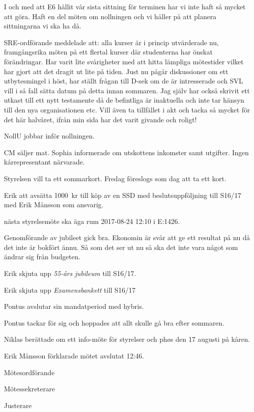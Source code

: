 \documentclass[10pt]{article}
\def\mo{Erik Månsson}
\def\ms{Johan Karlberg}
\def\ji{Linnea Sjödahl}
\begin{document}
\begin{paragrafer}
\begin{paragrafer}
I och med att E6 hållit vår sista sittning för terminen har vi inte haft så mycket att göra. Haft en del möten om nollningen och vi håller på att planera sittningarna vi ska ha då.

SRE-ordförande meddelade att: alla kurser är i princip utvärderade nu, framgångsrika möten på ett flertal kurser där studenterna har önskat förändringar. Har varit lite svårigheter med att hitta lämpliga mötestider vilket har gjort att det dragit ut lite på tiden. Just nu pågår diskussioner om ett utbytesmingel i höst, har ställt frågan till D-sek om de är intresserade och SVL vill i så fall sätta datum på detta innan sommaren. Jag själv har också skrivit ett utkast till ett nytt testamente då de befintliga är inaktuella och inte tar hänsyn till den nya organisationen etc. Vill även ta tillfället i akt och tacka så mycket för det här halvåret, ifrån min sida har det varit givande och roligt!

NollU jobbar inför nollningen.

CM säljer mat.
Sophia informerade om utskottens inkomster samt utgifter.
Ingen kårrepresentant närvarade.
\end{paragrafer}

Styrelsen vill ta ett sommarkort. Fredag föreslogs som dag att ta ett kort.

Erik \ypa att avsätta \SI{1000}{kr} till köp av en SSD med beslutsuppföljning till S16/17 med Erik Månsson som ansvarig.

\Mbaby

{\Mba} nästa styrelsemöte ska äga rum 2017-08-24 12:10 i E:1426.

Genomförande av jubileet gick bra. Ekonomin är svår att ge ett resultat på nu då det inte är bokfört ännu. Så som det ser ut nu så ska det inte vara något som ändrar sig från budgeten.

Erik \ypa skjuta upp \emph{55-års jubileum} till S16/17.

\Mbaby

Erik \ypa skjuta upp \emph{Examensbankett} till S16/17

\Mbaby
{}
Pontus avslutar sin mandatperiod med hybris.

Pontus tackar för sig och hoppades att allt skulle gå bra efter sommaren.

Niklas berättade om ett info-möte för styrelser och phøs den 17 augusti på kåren.

{\mo} förklarade mötet avslutat 12:46.

\end{paragrafer}

\hidesignfoot
\begin{signatures}{3}
\signature{\mo}{Mötesordförande}
\signature{\ms}{Mötessekreterare}
\signature{\ji}{Justerare}
\end{signatures}
\end{document}
